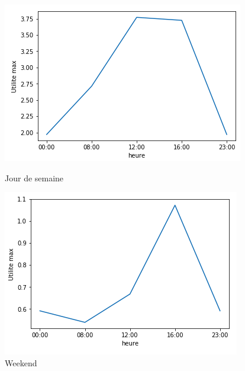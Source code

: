 \documentclass{report}
\begin{document}
\begin{figure}[H]
  \begin{minipage}{0.4\textwidth}
    \centering
    \includegraphics[scale=0.55]{images/utilitemax_semaine.png}
    \caption{Jour de semaine}\label{Fig:Data1}
  \end{minipage}\hfill
  \begin{minipage}{0.4\textwidth}
    \centering
    \includegraphics[scale=0.55]{images/utilitemax_wd.png}
    \caption{Weekend}\label{Fig:Data2}
  \end{minipage}
\end{figure} 
\end{document}
